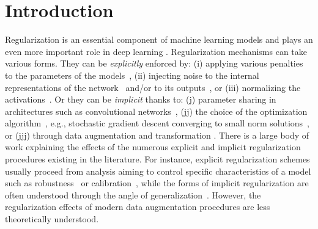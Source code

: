 \documentclass[twoside,11pt]{article}
\begin{document}
\section{Introduction}

Regularization is an essential component of machine learning models and 
plays an even more important role in deep learning \citep{goodfellow2016deep}. 
Regularization mechanisms can take various forms. They can be \emph{explicitly} enforced by: 
(i) applying various penalties to the parameters of the models~\citep{hinton1987learning, krogh1992simple, bartlett2017spectrally,neyshabur2015path, sedghi2018singular,arjovsky2017wasserstein}, (ii) injecting noise to the internal representations of the network~\citep{srivastava2014dropout, gal2016dropout} and/or to its outputs~\citep{szegedy2016rethinking,Muller2019When},
or (iii) normalizing the activations~\citep{he2016deep,salimans2016weight}.
Or they can be \emph{implicit} thanks to: (j) parameter sharing in architectures such as convolutional 
networks~\citep{lecun1998gradient}, (jj) the choice of the optimization algorithm~\citep{neyshabur2017implicit}, e.g., stochastic gradient descent converging to small norm solutions~\citep{arora2019implicit}, 
or (jjj) through data augmentation and transformation \citep{goodfellow2016deep}.
There is a large body of work explaining the effects of the numerous explicit and implicit 
regularization procedures existing in the literature. 
For instance, explicit regularization schemes usually proceed from analysis aiming to control specific 
characteristics of a model such as robustness~\citep{hein2017formal,cisse2017parseval} or 
calibration~\citep{guo2017calibration,Muller2019When}, while the forms of implicit regularization are 
often understood through the angle of generalization~\citep{neyshabur2017implicit, arora2019implicit}. 
However, the regularization effects of modern data augmentation procedures are less theoretically understood. 
\end{document}
